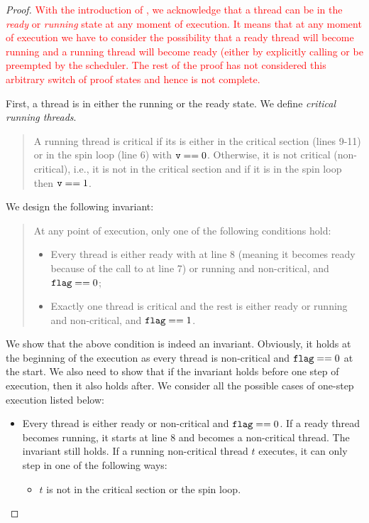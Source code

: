 \documentclass{article}[10pt]
\begin{document}
\begin{proof}

  \textcolor{red}{With the introduction of , we acknowledge
    that a thread can be in the \emph{ready} or \emph{running} state
    at any moment of execution. It means that at any moment of
    execution we have to consider the possibility that a ready thread
    will become running and a running thread will become ready (either
    by explicitly calling  or be preempted by the
    scheduler. The rest of the proof has not considered this arbitrary
    switch of proof states and hence is not complete.}

  First, a thread is in either the running or the ready state. We
  define \emph{critical running threads}.
  \begin{quote}
    A running thread is critical if its  is either in the
    critical section (lines 9-11) or in the spin loop (line 6) with
    $\text{\ttfamily v} == 0$. Otherwise, it is not critical (non-critical), i.e., it
    is not in the critical section and if it is in the spin loop then
    $\text{\ttfamily v} == 1$.
  \end{quote}
  We design the following invariant:
  \begin{quote}
    At any point of execution, only one of the following conditions hold:
    \begin{itemize}
    \item Every thread is either ready with  at line 8
      (meaning it becomes ready because of the call to  at
      line 7) or running and non-critical, and $\text{\ttfamily flag} == 0$;
    \item Exactly one thread is critical and the rest is either ready
      or running and non-critical, and $\text{\ttfamily flag} == 1$.
    \end{itemize}
  \end{quote}
  We show that the above condition is indeed an
  invariant. Obviously, it holds at the beginning of the execution as
  every thread is non-critical and $\text{\ttfamily flag} == 0$ at the start. We also
  need to show that if the invariant holds before one step of
  execution, then it also holds after. We consider all the possible
  cases of one-step execution listed below:
  \begin{itemize}
  \item Every thread is either ready or non-critical and $\text{\ttfamily flag} ==
    0$. If a ready thread becomes running, it starts at line 8 and
    becomes a non-critical thread. The invariant still holds. If a
    running non-critical thread $t$ executes, it can only step in one
    of the following ways:
    \begin{itemize}
    \item $t$ is not in the critical section or the spin loop. 


\end{itemize}
\end{itemize}
\end{proof}
\end{document}
